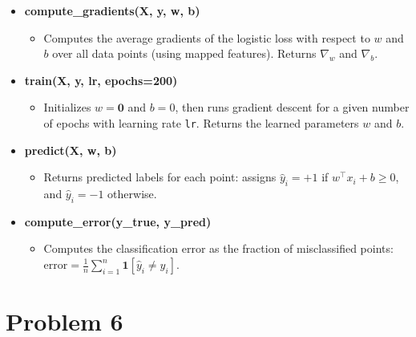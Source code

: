 \documentclass[12pt,fleqn]{article}
\begin{document}
\begin{itemize}
  \item \textbf{compute\_gradients(X, y, w, b)}
  \begin{itemize}
    \item Computes the average gradients of the logistic loss with respect to $w$ and $b$ over all data points (using mapped features). Returns $\nabla_w$ and $\nabla_b$.
  \end{itemize}

  \item \textbf{train(X, y, lr, epochs=200)}
  \begin{itemize}
    \item Initializes $w = \mathbf{0}$ and $b = 0$, then runs gradient descent for a given number of epochs with learning rate \texttt{lr}. Returns the learned parameters $w$ and $b$.
  \end{itemize}

  \item \textbf{predict(X, w, b)}
  \begin{itemize}
    \item Returns predicted labels for each point: assigns $\hat{y}_i = +1$ if $w^\top x_i + b \geq 0$, and $\hat{y}_i = -1$ otherwise.
  \end{itemize}

  \item \textbf{compute\_error(y\_true, y\_pred)}
  \begin{itemize}
    \item Computes the classification error as the fraction of misclassified points: $\text{error} = \frac{1}{n}\sum_{i=1}^{n} \mathbf{1}[\hat{y}_i \neq y_i]$.
  \end{itemize}
\end{itemize}

\newpage
\section*{Problem 6}
\end{document}
